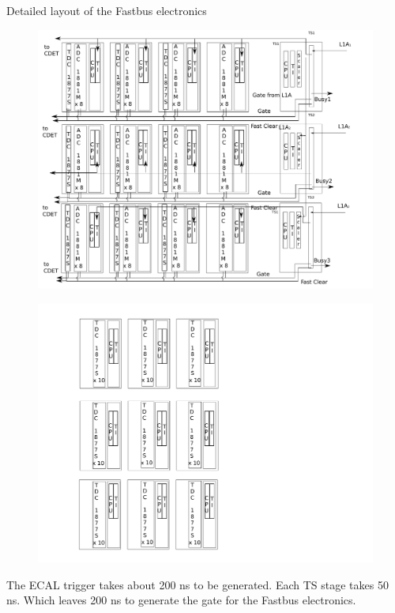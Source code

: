 \documentclass{article}
\begin{document}
Detailed layout of the Fastbus electronics
\begin{figure}
\includegraphics[scale=0.55]{figs/FastbusEcalDetailed.pdf}\\
\end{figure}

\begin{figure}

\includegraphics[scale=0.55]{figs/FastbusCDetDetailed.pdf}\\
\end{figure}

The ECAL trigger takes about 200 ns to be generated. Each TS stage takes 50 ns. Which leaves 200 ns to generate the gate for the Fastbus electronics.
\end{document}
